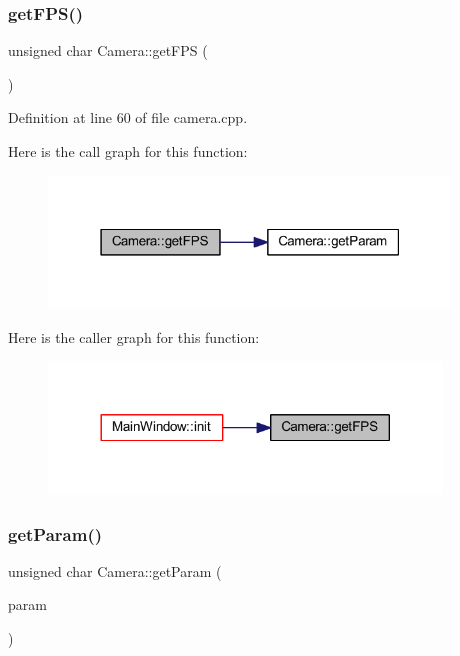 \subsubsection{\texorpdfstring{getFPS()}{getFPS()}}
{\footnotesize\ttfamily unsigned char Camera\+::get\+F\+PS (\begin{DoxyParamCaption}{ }\end{DoxyParamCaption})}



Definition at line 60 of file camera.\+cpp.

Here is the call graph for this function\+:
\nopagebreak
\begin{figure}[H]
\begin{center}
\leavevmode
\includegraphics[width=303pt]{classCamera_a4702bbf7ccf85a5a2dd61fbf6abb7237_cgraph}
\end{center}
\end{figure}
Here is the caller graph for this function\+:
\nopagebreak
\begin{figure}[H]
\begin{center}
\leavevmode
\includegraphics[width=296pt]{classCamera_a4702bbf7ccf85a5a2dd61fbf6abb7237_icgraph}
\end{center}
\end{figure}
\mbox{\label{classCamera_ab906269480057a5634f0760b3598e71f}} 
\subsubsection{\texorpdfstring{getParam()}{getParam()}}
{\footnotesize\ttfamily unsigned char Camera\+::get\+Param (\begin{DoxyParamCaption}\item[{cv\+::\+Video\+Capture\+Properties}]{param }\end{DoxyParamCaption})}



